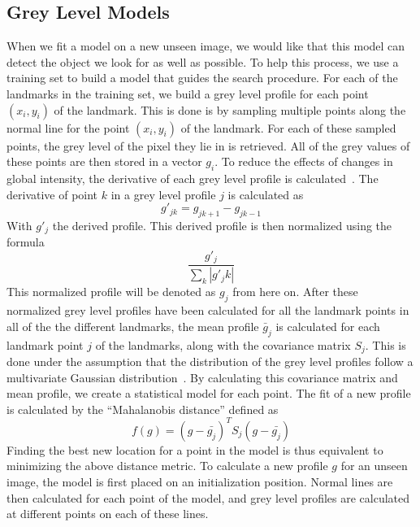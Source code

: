 \documentclass[a4paper]{article}
\begin{document}
\subsection{Grey Level Models}
\label{subsect:grey-level-models}
When we fit a model on a new unseen image, we would like that this model can detect the object we look for as well as possible.
To help this process, we use a training set to build a model that guides the search procedure.
For each of the landmarks in the training set, we build a grey level profile for each point $({x_i, y_i})$ of the landmark.
This is done is by sampling multiple points along the normal line for the point $({x_i, y_i})$ of the landmark.
For each of these sampled points, the grey level of the pixel they lie in is retrieved.
All of the grey values of these points are then stored in a vector \textbf{$g_i$}.
To reduce the effects of changes in global intensity, the derivative of each grey level profile is calculated~\cite{cootes1996statistical}.
The derivative of point $k$ in a grey level profile $j$ is calculated as
\begin{equation}
g'_{jk} = g_{jk+1} - g_{jk-1} 
\end{equation}
With $g'_j$ the derived profile. 
This derived profile is then normalized using the formula
\begin{equation}
\frac{g'_j}{\sum_k |g'_jk|}
\end{equation}
This normalized profile will be denoted as $g_j$ from here on.
After these normalized grey level profiles have been calculated for all the landmark points in all of the the different landmarks, the mean profile $\bar{g}_j$ is calculated for each landmark point $j$ of the landmarks, along with the covariance matrix $S_j$.
This is done under the assumption that the distribution of the grey level profiles follow a multivariate Gaussian distribution~\cite{Cootes1992AnIT}.
By calculating this covariance matrix and mean profile, we create a statistical model for each point.
The fit of a new profile is calculated by the ``Mahalanobis distance'' defined as
\begin{equation}
f(g) = (g-\bar{g_j})^TS_j(g-\bar{g_j})
\end{equation}
Finding the best new location for a point in the model is thus equivalent to minimizing the above distance metric.
To calculate a new profile $g$ for an unseen image, the model is first placed on an initialization position.
Normal lines are then calculated for each point of the model, and grey level profiles are calculated at different points on each of these lines.
\end{document}
